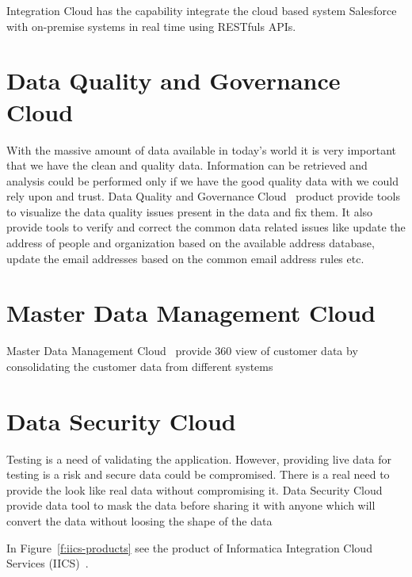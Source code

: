 Integration Cloud has the capability integrate the cloud based system Salesforce~\cite{hid-sp18-511-salesforce} with on-premise systems in real time using RESTfuls APIs.

\section{Data Quality and Governance Cloud}

With the massive amount of data available in today's world it is very important that we have the clean and quality data. Information can be retrieved and analysis could be performed only if we have the good quality data with we could rely upon and trust. Data Quality and Governance Cloud~\cite{hid-sp18-511-iics} product provide tools to visualize the data quality issues present in the data and fix them. It also provide tools to verify and correct the common data related issues like update the address of people and organization based on the available address database, update the email addresses based on the common email address rules etc.

\section{Master Data Management Cloud}
Master Data Management Cloud~\cite{hid-sp18-511-iics} provide 360 view of customer data by consolidating the customer data from different systems

\section{Data Security Cloud}
Testing is a need of validating the application. However, providing live data for testing is a risk and secure data could be compromised. There is a real need to provide the look like real data without compromising it. Data Security Cloud\cite{hid-sp18-511-iics} provide data tool to mask the data before sharing it with anyone which will convert the data without loosing the shape of the data

In Figure~\ref{f:iics-products}\cite{hid-sp18-511-iics} see the product of Informatica Integration
Cloud Services (IICS)~\cite{hid-sp18-511-iics}.


